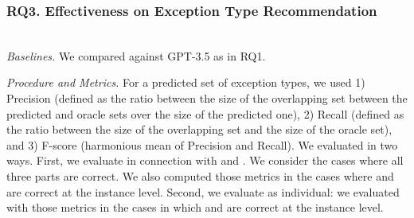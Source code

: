 \subsubsection{RQ3. Effectiveness on Exception Type Recommendation}~\\
{\em Baselines.} We compared {\xtype} against GPT-3.5 as in RQ1.






{\em Procedure and Metrics.} For a predicted set of exception types,
we used 1) Precision (defined as the ratio between the size of the
overlapping set between the predicted and oracle sets over the size of
the predicted one), 2) Recall (defined as the ratio between the size of
the overlapping set and the size of the oracle set), and 3) F-score
(harmonious mean of Precision and Recall). We evaluated {\tool} in two
ways. First, we evaluate {\xtype} in connection with {\xblock} and
{\xstate}. We consider the cases where all three parts are correct.
We also computed those metrics in the cases where {\xblock} and
{\xstate} are correct at the instance level. Second, we evaluate
{\xtype} as individual: we evaluated {\xtype} with those metrics in
the cases in which {\xblock} and {\xstate} are correct at the instance
level.



